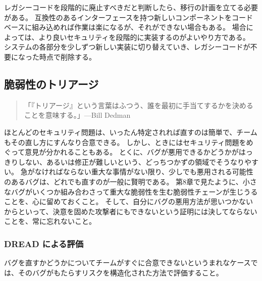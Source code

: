 \documentclass[uplatex]{jsarticle}
\begin{document}
レガシーコードを段階的に廃止すべきだと判断したら、移行の計画を立てる必要がある。
互換性のあるインターフェースを持つ新しいコンポーネントをコードベースに組み込めれば作業は楽になるが、それができない場合もある。
場合によっては、より良いセキュリティを段階的に実装するのがよいやり方である。
システムの各部分を少しずつ新しい実装に切り替えていき、レガシーコードが不要になった時点で削除する。

\subsection{脆弱性のトリアージ}

\begin{quote}
「『トリアージ』という言葉はふつう、誰を最初に手当てするかを決めることを意味する。」---Bill Dedman
\end{quote}

ほとんどのセキュリティ問題は、いったん特定されれば直すのは簡単で、チームもその直し方にすんなり合意できる。
しかし、ときにはセキュリティ問題をめぐって意見が分かれることもある。
とくに、バグが悪用できるかどうかがはっきりしない、あるいは修正が難しいという、どっちつかずの領域でそうなりやすい。
急がなければならない重大な事情がない限り、少しでも悪用される可能性のあるバグは、どれでも直すのが一般に賢明である。
第8章で見たように、小さなバグがいくつか組み合わさって重大な脆弱性を生む脆弱性チェーンが生じうることを、心に留めておくこと。
そして、自分にバグの悪用方法が思いつかないからといって、決意を固めた攻撃者にもできないという証明には決してならないことを、常に忘れないこと。

\subsubsection{DREAD による評価}

バグを直すかどうかについてチームがすぐに合意できないというまれなケースでは、そのバグがもたらすリスクを構造化された方法で評価すること。
\end{document}
